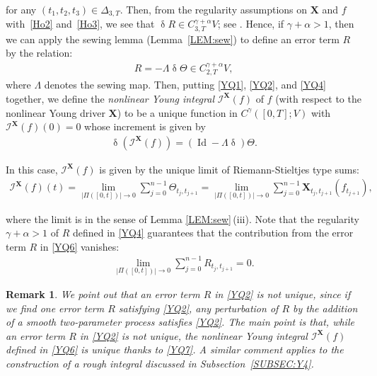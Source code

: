\documentclass[letterpaper, 11pt,  reqno]{amsart}
\newtheorem{remark}[theorem]{Remark}
\DeclareMathOperator{\Id}{Id}
\newcommand{\1}{\hspace{0.5mm}\textup{I}\hspace{0.5mm}}
\newcommand{\I}{\mathcal{I}}
\newcommand{\noi}{\noindent}
\newcommand{\al}{\alpha}
\newcommand{\updl}{\updelta}
\newcommand{\Dl}{\Delta}
\newcommand{\g}{\gamma}
\newcommand{\Ld}{\Lambda}
\newcommand{\Ta}{\Theta}
\newcommand{\XX}{\mathbf{X}}
\numberwithin{equation}{section}
\numberwithin{theorem}{section}
\begin{document}
\noi
for any $(t_1, t_2, t_3) \in\Dl_{3, T}$.
Then, from  the regularity assumptions on $\XX$
and $f$
with~\eqref{Ho2} and~\eqref{Ho3}, 
we see that 
$\updl R 
 \in C^{\g + \al}_{3,T}V$;  see \cite[(3.27)]{CGLLO1}.
Hence, if $\g + \al > 1$, 
then we can apply the sewing lemma (Lemma~\ref{LEM:sew})
to define an error term $R$ by the relation:
\begin{align}
R = - \Ld \updl  \Theta
\in C^{\g + \al}_{2,T}V,
\label{YQ4} 
\end{align}
where $\Ld$ denotes the sewing map.
Then, 
putting
 \eqref{YQ1},  
 \eqref{YQ2},  
and \eqref{YQ4} together,   
we define the {\it nonlinear Young integral} $\I^\XX(f)$ of $f$
(with respect to the nonlinear Young driver $\XX$)
to be  a unique function 
in $ C^\g([0,T]; V)$
with $\I^\XX(f)(0) = 0$
whose increment is given by 
\begin{align}
\updl (\I^\XX(f))
= (\Id - \Ld \updl )\Ta.
\label{YQ5}
\end{align}

\noi
In this case, $\I^\XX(f)$ 
is given by 
the unique limit of 
Riemann-Stieltjes type sums:
\begin{align}
\I^\XX(f)(t) 
= \lim_{|\Pi([0,t])|\to 0} 
\sum^{n-1}_{j=0} \Theta_{t_j,t_{j+1}}
= \lim_{|\Pi([0,t])|\to 0} 
\sum^{n-1}_{j=0} \XX_{t_j,t_{j+1}}(f_{t_{j+1}}), 
\label{YQ6}
\end{align} 
 
 
 
\noi
 where 
the limit is in the sense of Lemma \ref{LEM:sew}\,(iii).
Note that the regularity $\g + \al > 1$
of $R$ defined in \eqref{YQ4}
guarantees that the contribution from the error term $R$ in \eqref{YQ6}
vanishes:
\begin{align}
 \lim_{|\Pi([0,t])|\to 0} 
\sum^{n-1}_{j=0} R_{t_j,t_{j+1}} = 0.
\label{YQ7}
\end{align} 
 

\begin{remark}\label{REM:uniq1}
\rm
We point out that 
an error term $R$ in \eqref{YQ2} is not unique, since
if we find one error term $R$ satisfying \eqref{YQ2}, 
any perturbation of $R$ by the addition of a smooth two-parameter process
satisfies \eqref{YQ2}.
The main point is that, while an error term $R$ in  \eqref{YQ2}
is not unique, the nonlinear Young integral $\I^\XX(f)$ defined in \eqref{YQ6}
is unique thanks to \eqref{YQ7}.
A similar comment applies to 
the construction of a rough integral discussed in Subsection~\ref{SUBSEC:Y4}.
\end{remark}
	
\end{document}
